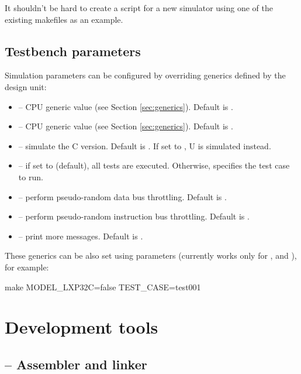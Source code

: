 \documentclass[a4paper,12pt,twoside,extrafontsizes]{memoir}
\begin{document}
It shouldn't be hard to create a script for a new simulator using one of the existing makefiles as an example.

\section{Testbench parameters}

Simulation parameters can be configured by overriding generics defined by the  design unit:

\begin{itemize}
	\item {} --  CPU generic value (see Section \ref{sec:generics}). Default is .
	\item {} --  CPU generic value (see Section \ref{sec:generics}). Default is .
	\item {} -- simulate the \lxp{}C version. Default is . If set to , \lxp{}U is simulated instead.
	\item {} -- if set to  (default), all tests are executed. Otherwise, specifies the test case to run.
	\item {} -- perform pseudo-random data bus throttling. Default is .
	\item {} -- perform pseudo-random instruction bus throttling. Default is .
	\item {} -- print more messages. Default is .
\end{itemize}

These generics can be also set using  parameters (currently works only for ,  and ), for example:

\begin{codepar}
    make MODEL_LXP32C=false TEST_CASE=test001
\end{codepar}

\chapter{Development tools}
\label{ch:developmenttools}

\section{ -- Assembler and linker}
\label{sec:lxp32asm}
\end{document}
